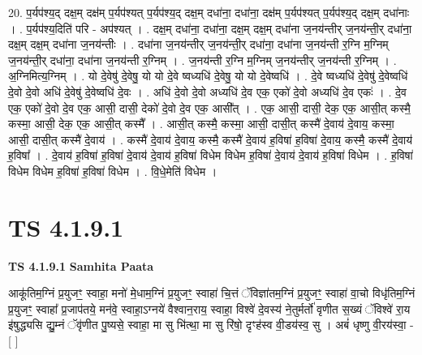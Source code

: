 \documentclass[17pt]{extarticle}
\begin{document}
20. प॒र्यप॑श्य॒द् दक्ष॒म् दक्ष॑म् प॒र्यप॑श्यत् प॒र्यप॑श्य॒द् दक्ष॒म् दधा॑ना॒ दधा॑ना॒ दक्ष॑म् प॒र्यप॑श्यत् प॒र्यप॑श्य॒द् दक्ष॒म् दधा॑नाः । . प॒र्यप॑श्य॒दिति॑ परि - अप॑श्यत् । . दक्ष॒म् दधा॑ना॒ दधा॑ना॒ दक्ष॒म् दक्ष॒म् दधा॑ना ज॒नय॑न्तीर् ज॒नय॑न्ती॒र् दधा॑ना॒ दक्ष॒म् दक्ष॒म् दधा॑ना ज॒नय॑न्तीः । . दधा॑ना ज॒नय॑न्तीर् ज॒नय॑न्ती॒र् दधा॑ना॒ दधा॑ना ज॒नय॑न्ती र॒ग्नि म॒ग्निम् ज॒नय॑न्ती॒र् दधा॑ना॒ दधा॑ना ज॒नय॑न्ती र॒ग्निम् । . ज॒नय॑न्ती र॒ग्नि म॒ग्निम् ज॒नय॑न्तीर् ज॒नय॑न्ती र॒ग्निम् । . अ॒ग्निमित्य॒ग्निम् । . यो दे॒वेषु॑ दे॒वेषु॒ यो यो दे॒वे ष्वध्यधि॑ दे॒वेषु॒ यो यो दे॒वेष्वधि॑ । . दे॒वे ष्वध्यधि॑ दे॒वेषु॑ दे॒वेष्वधि॑ दे॒वो दे॒वो अधि॑ दे॒वेषु॑ दे॒वेष्वधि॑ दे॒वः । . अधि॑ दे॒वो दे॒वो अध्यधि॑ दे॒व एक॒ एको॑ दे॒वो अध्यधि॑ दे॒व एकः॑ । . दे॒व एक॒ एको॑ दे॒वो दे॒व एक॒ आसी॒ दासी॒ देको॑ दे॒वो दे॒व एक॒ आसी᳚त् । . एक॒ आसी॒ दासी॒ देक॒ एक॒ आसी॒त् कस्मै॒ कस्मा॒ आसी॒ देक॒ एक॒ आसी॒त् कस्मै᳚ । . आसी॒त् कस्मै॒ कस्मा॒ आसी॒ दासी॒त् कस्मै॑ दे॒वाय॑ दे॒वाय॒ कस्मा॒ आसी॒ दासी॒त् कस्मै॑ दे॒वाय॑ । . कस्मै॑ दे॒वाय॑ दे॒वाय॒ कस्मै॒ कस्मै॑ दे॒वाय॑ ह॒विषा॑ ह॒विषा॑ दे॒वाय॒ कस्मै॒ कस्मै॑ दे॒वाय॑ ह॒विषा᳚ । . दे॒वाय॑ ह॒विषा॑ ह॒विषा॑ दे॒वाय॑ दे॒वाय॑ ह॒विषा॑ विधेम विधेम ह॒विषा॑ दे॒वाय॑ दे॒वाय॑ ह॒विषा॑ विधेम । . ह॒विषा॑ विधेम विधेम ह॒विषा॑ ह॒विषा॑ विधेम । . वि॒धे॒मेति॑ विधेम । \newline
\pagebreak
{}

\section{ TS 4.1.9.1 }

\textbf{TS 4.1.9.1 } \newline
\textbf{Samhita Paata} \newline

आकू॑तिम॒ग्निं प्र॒युजꣳ॒॒ स्वाहा॒ मनो॑ मे॒धाम॒ग्निं प्र॒युजꣳ॒॒ स्वाहा॑ चि॒त्तं ॅविज्ञा॑तम॒ग्निं प्र॒युजꣳ॒॒ स्वाहा॑ वा॒चो विधृ॑तिम॒ग्निं प्र॒युजꣳ॒॒ स्वाहा᳚ प्र॒जाप॑तये॒ मन॑वे॒ स्वाहा॒ऽग्नये॑ वैश्वान॒राय॒ स्वाहा॒ विश्वे॑ दे॒वस्य॑ ने॒तुर्मर्तो॑ वृणीत स॒ख्यं ॅविश्वे॑ रा॒य इ॑षुद्ध्यसि द्यु॒म्नं ॅवृ॑णीत पु॒ष्यसे॒ स्वाहा॒ मा सु भि॑त्था॒ मा सु रि॑षो॒ दृꣳह॑स्व वी॒डय॑स्व॒ सु । अबं॑ धृष्णु वी॒रय॑स्वा॒ - [  ] \newline
\end{document}
